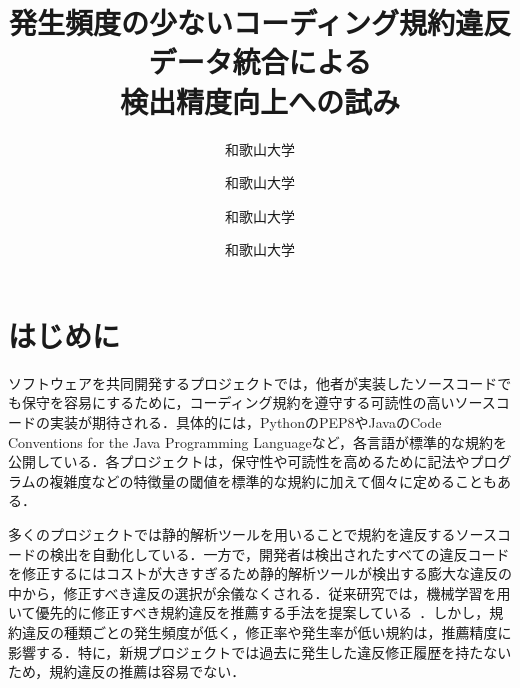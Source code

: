 \documentclass[uplatex,dvipdfmx,a4paper,twocolumn,base=11pt,jbase=11pt,ja=standard]{bxjsarticle}  %
\title{発生頻度の少ないコーディング規約違反データ統合による\\検出精度向上への試み}{Toward improving detection accuracy by integrating occasional coding convention violations datasets}
\author{和歌山大学}{亀岡　令}{Ryo Kameoka, Wakayama University}
\author{和歌山大学}{伊原　彰紀}{Akinori Ihara, Wakayama University}
\author{和歌山大学}{南　雄太}{Yuta Minami, Wakayama University}
\author{和歌山大学}{大森　楓木}{Fuki Omori, Wakayama University}
\begin{document}
\maketitle

\section{はじめに}
ソフトウェアを共同開発するプロジェクトでは，他者が実装したソースコードでも保守を容易にするために，コーディング規約を遵守する可読性の高いソースコードの実装が期待される．具体的には，PythonのPEP8やJavaのCode Conventions for the Java Programming Languageなど，各言語が標準的な規約を公開している．各プロジェクトは，保守性や可読性を高めるために記法やプログラムの複雑度などの特徴量の閾値を標準的な規約に加えて個々に定めることもある．


多くのプロジェクトでは静的解析ツールを用いることで規約を違反するソースコードの検出を自動化している．一方で，開発者は検出されたすべての違反コードを修正するにはコストが大きすぎるため静的解析ツールが検出する膨大な違反の中から，修正すべき違反の選択が余儀なくされる．従来研究では，機械学習を用いて優先的に修正すべき規約違反を推薦する手法を提案している~\cite{article1}．しかし，規約違反の種類ごとの発生頻度が低く，修正率や発生率が低い規約は，推薦精度に影響する．特に，新規プロジェクトでは過去に発生した違反修正履歴を持たないため，規約違反の推薦は容易でない．


\end{document}
